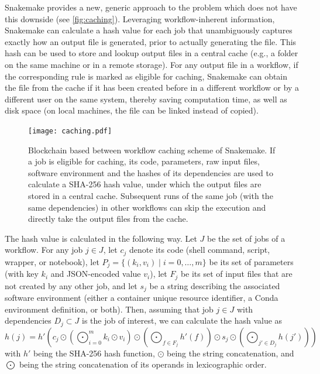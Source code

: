 \documentclass[parskip=half, DIV=18]{scrartcl}
\begin{document}
Snakemake provides a new, generic approach to the problem which does not have this downside (see \autoref{fig:caching}).
Leveraging workflow-inherent information, Snakemake can calculate a hash value for each job that unambiguously captures exactly how an output file is generated, prior to actually generating the file.
This hash can be used to store and lookup output files in a central cache (e.g., a folder on the same machine or in a remote storage).
For any output file in a workflow, if the corresponding rule is marked as eligible for caching, Snakemake can obtain the file from the cache if it has been created before in a different workflow or by a different user on the same system, thereby saving computation time, as well as disk space (on local machines, the file can be linked instead of copied).

\begin{figure}
	\centering
	\texttt{[image: caching.pdf]}
	\caption{
		Blockchain based between workflow caching scheme of Snakemake.
		If a job is eligible for caching, its code, parameters, raw input files, software environment and the hashes of its dependencies are used to calculate a SHA-256 hash value, under which the output files are stored in a central cache.
		Subsequent runs of the same job (with the same dependencies) in other workflows can skip the execution and directly take the output files from the cache.
	}
	\label{fig:caching}
\end{figure}

The hash value is calculated in the following way.
Let $J$ be the set of jobs of a workflow.
For any job $j \in J$, let $c_j$ denote its code (shell command, script, wrapper, or notebook), let $P_j = \{(k_i, v_i) \mid i=0,\dots,m\}$ be its set of parameters (with key $k_i$ and JSON-encoded value $v_i$), let $F_j$ be its set of input files that are not created by any other job, and let $s_j$ be a string describing the associated software environment (either a container unique resource identifier, a Conda environment definition, or both).
Then, assuming that job $j \in J$ with dependencies $D_j \subset J$ is the job of interest, we can calculate the hash value as $$ h(j) = h'\left( c_j \odot \left(\bigodot_{i=0}^m k_i \odot v_i \right) \odot \left( \bigodot_{f \in F_j} h'(f) \right) \odot s_j \odot \left( \bigodot_{j' \in D_j} h(j') \right) \right) $$ with $h'$ being the SHA-256 \parencite{Handschuh} hash function, $\odot$ being the string concatenation, and $\bigodot$ being the string concatenation of its operands in lexicographic order.
\end{document}
